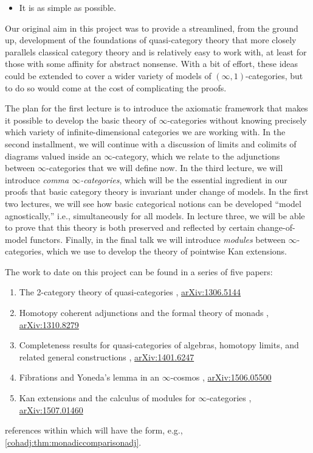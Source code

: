 \documentclass[12pt,reqno]{amsart}
\theoremstyle{plain}
\theoremstyle{definition}
\theoremstyle{remark}
\numberwithin{equation}{subsection}
\newcommand{\extRef}[3]{%
  {\protect\IfBeginWith{#3}{itm:}{}{#2.}}\ref*{#1:#3}}
\newcommand{\refII}{\extRef{cohadj}{II}}
\begin{document}
\begin{itemize}
\item It is as simple as possible.
\end{itemize}
Our original aim in this project was to provide a streamlined, from the ground up, development of the foundations of quasi-category theory that more closely parallels classical category theory and is relatively easy to work with, at least for those with some affinity for abstract nonsense. With a bit of effort, these ideas could be extended to cover  a wider variety of models of $(\infty,1)$-categories, but to do so would come at the cost of complicating the proofs. 

The plan for the first lecture is to introduce the axiomatic framework that makes it possible to develop the basic theory of $\infty$-categories without knowing precisely which variety of infinite-dimensional categories we are working with. In the second installment, we will continue with a discussion of limits and colimits of diagrams valued inside an $\infty$-category, which we relate to the adjunctions between $\infty$-categories that we will define now. In the third lecture, we will introduce \emph{comma $\infty$-categories}, which will be the essential ingredient in our proofs that basic category theory  is invariant under change of models. In the first two lectures, we will see how basic categorical notions can be developed ``model agnostically,'' i.e., simultaneously for all models. In lecture three, we will be able to prove that this theory is both preserved and reflected by certain change-of-model functors. Finally, in the final talk we will introduce \emph{modules} between $\infty$-categories, which we use to develop the theory of pointwise Kan extensions.

The work to date on this project can be found in a series of five papers:
\begin{enumerate}[label=\Roman*.]
\item The 2-category theory of quasi-categories \cite{RiehlVerity:2012tt}, \href{http://arxiv.org/abs/1306.5144}{ar\-Xiv:1306.5144}
\item Homotopy coherent adjunctions and the formal theory of monads \cite{RiehlVerity:2012hc},\\ \href{http://arxiv.org/abs/1310.8279}{arXiv:1310.8279}
\item Completeness results for quasi-categories of algebras, homotopy limits, and related general constructions \cite{RiehlVerity:2013cp}, \href{http://arxiv.org/abs/1401.6247}{arXiv:1401.6247}
\item Fibrations and Yoneda's lemma in an $\infty$-cosmos \cite{RiehlVerity:2015fy},  \href{http://arxiv.org/abs/1506.05500}{arXiv:1506.05500}
\item Kan extensions and the calculus of modules for $\infty$-categories \cite{RiehlVerity:2015ke}, \\ \href{http://arxiv.org/abs/1507.01460}{arXiv:1507.01460}
\end{enumerate}
references within which will have the form, e.g., \refII{thm:monadiccomparisonadj}.
\end{document}
